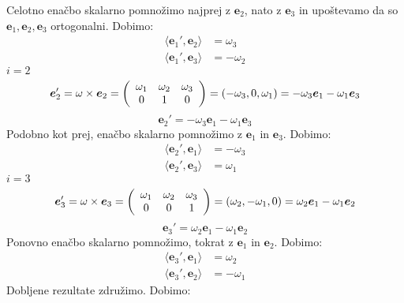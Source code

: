 \documentclass[mat1]{fmfdelo}
\newcommand{\e}{\boldsymbol e}
\begin{document}
\begin{dokaz}
\begin{equation*}
\end{equation*}
Celotno enačbo skalarno pomnožimo najprej z $\e_2$, nato z $\e_3$ in upoštevamo da so $\e_1,\e_2,\e_3$ ortogonalni. Dobimo:
\begin{equation*}
\begin{split}
\langle \e_1', \e_2 \rangle & = \omega_3 \\
\langle \e_1', \e_3 \rangle &= -\omega_2
\end{split}
\end{equation*}
$i=2$
\begin{equation*}
\e_2' = \omega \times \e_2 = \left(
\begin{array}{c c c}
\omega_1 & \omega_2 & \omega_3 \\
0 & 1 & 0
\end{array} \right)
= (-\omega_3, 0,\omega_1) = -\omega_3\e_1 - \omega_1\e_3
\end{equation*}
\begin{equation*}
\e_2' = -\omega_3\e_1-\omega_1\e_3
\end{equation*}
Podobno kot prej, enačbo skalarno pomnožimo z $\e_1$ in $\e_3$. Dobimo:
\begin{equation*}
\begin{split}
\langle \e_2', \e_1 \rangle & = -\omega_3 \\
\langle \e_2', \e_3 \rangle &= \omega_1
\end{split}
\end{equation*}
$i=3$
\begin{equation*}
\e_3' = \omega \times \e_3 = \left(
\begin{array}{c c c}
\omega_1 & \omega_2 & \omega_3 \\
0 & 0 & 1
\end{array} \right)
= (\omega_2, -\omega_1,0) = \omega_2\e_1 - \omega_1\e_2
\end{equation*}
\begin{equation*}
\e_3' = \omega_2\e_1-\omega_1\e_2
\end{equation*}
Ponovno enačbo skalarno pomnožimo, tokrat z $\e_1$ in $\e_2$. Dobimo:
\begin{equation*}
\begin{split}
\langle \e_3', \e_1 \rangle & = \omega_2 \\
\langle \e_3', \e_2 \rangle &= -\omega_1
\end{split}
\end{equation*}
Dobljene rezultate združimo. Dobimo:
\begin{equation}
\begin{split}

\end{split}
\end{equation}
\end{dokaz}
\end{document}
